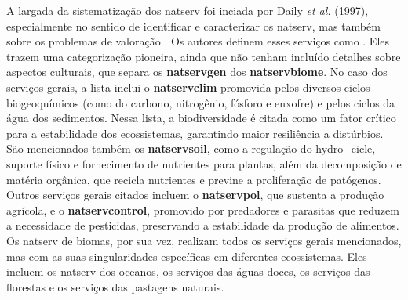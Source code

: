 \documentclass[./main.tex]{subfiles}
\begin{document}
\par A largada da sistematização dos \gls{natserv} foi inciada por Daily \textit{et al.} (1997), especialmente no sentido de identificar e caracterizar os \gls{natserv}, mas também sobre os problemas de valoração \cite{daily1997}. Os autores definem esses serviços como . Eles trazem uma categorização pioneira, ainda que não tenham incluído detalhes sobre aspectos culturais, que separa os \textbf{\gls{natservgen}} dos \textbf{\gls{natservbiome}}. No caso dos serviços gerais, a lista inclui o \textbf{\gls{natservclim}} promovida pelos diversos ciclos biogeoquímicos (como do carbono, nitrogênio, fósforo e enxofre) e pelos ciclos da água dos sedimentos. Nessa lista, a biodiversidade é citada como um fator crítico para a estabilidade dos ecossistemas, garantindo maior resiliência a distúrbios. São mencionados também os \textbf{\gls{natservsoil}}, como a regulação do \gls{hydro_cicle}, suporte físico e fornecimento de nutrientes para plantas, além da decomposição de matéria orgânica, que recicla nutrientes e previne a proliferação de patógenos. Outros serviços gerais citados incluem o \textbf{\gls{natservpol}}, que sustenta a produção agrícola, e o \textbf{\gls{natservcontrol}}, promovido por predadores e parasitas que reduzem a necessidade de pesticidas, preservando a estabilidade da produção de alimentos. Os \gls{natserv} de biomas, por sua vez, realizam todos os serviços gerais mencionados, mas com as suas singularidades específicas em diferentes ecossistemas. Eles incluem os \gls{natserv} dos oceanos, os serviços das águas doces, os serviços das florestas e os serviços das pastagens naturais.
\end{document}
